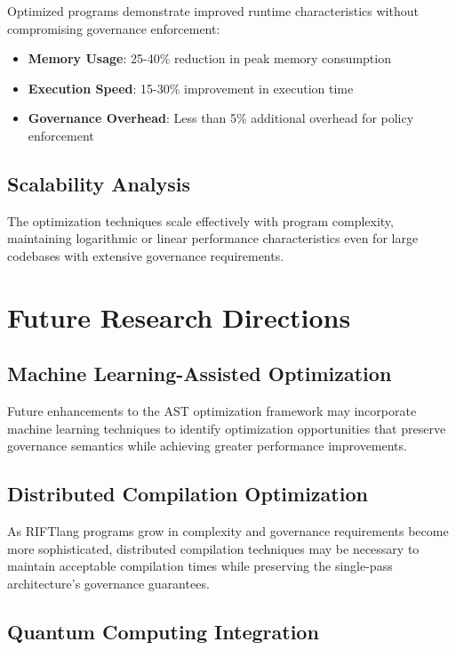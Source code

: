 Optimized programs demonstrate improved runtime characteristics without compromising governance enforcement:

\begin{itemize}
\item \textbf{Memory Usage}: 25-40\% reduction in peak memory consumption
\item \textbf{Execution Speed}: 15-30\% improvement in execution time
\item \textbf{Governance Overhead}: Less than 5\% additional overhead for policy enforcement
\end{itemize}

\subsection{Scalability Analysis}

The optimization techniques scale effectively with program complexity, maintaining logarithmic or linear performance characteristics even for large codebases with extensive governance requirements.

\section{Future Research Directions}

\subsection{Machine Learning-Assisted Optimization}

Future enhancements to the AST optimization framework may incorporate machine learning techniques to identify optimization opportunities that preserve governance semantics while achieving greater performance improvements.

\subsection{Distributed Compilation Optimization}

As RIFTlang programs grow in complexity and governance requirements become more sophisticated, distributed compilation techniques may be necessary to maintain acceptable compilation times while preserving the single-pass architecture's governance guarantees.

\subsection{Quantum Computing Integration}

